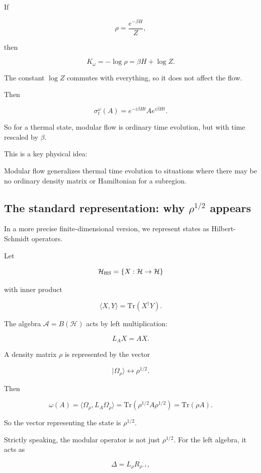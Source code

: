 \documentclass[11pt,a4paper]{article}
\newenvironment{qiqtquote}{\begin{mdframed}[style=quotestyle]}{\end{mdframed}}
\begin{document}
If

\[
\rho=\frac{e^{-\beta H}}{Z},
\]

then

\[
K_\omega=-\log\rho
=
\beta H+\log Z.
\]

The constant $\log Z$ commutes with everything, so it does not affect the flow.

Then

\[
\sigma_t^\omega(A)
=
e^{-i\beta H t} A e^{i\beta H t}.
\]

So for a thermal state, modular flow is ordinary time evolution, but with time rescaled by $\beta$.

This is a key physical idea:

\begin{qiqtquote}
Modular flow generalizes thermal time evolution to situations where there may be no ordinary density matrix or Hamiltonian for a subregion.
\end{qiqtquote}

\subsection{The standard representation: why $\rho^{1/2}$ appears}

In a more precise finite-dimensional version, we represent states as Hilbert-Schmidt operators.

Let

\[
\mathcal{H}_{\rm HS}
=
\{X:\mathcal{H}\to\mathcal{H}\}
\]

with inner product

\[
\langle X,Y\rangle=\mathrm{Tr}(X^\dagger Y).
\]

The algebra $\mathcal{A}=B(\mathcal{H})$ acts by left multiplication:

\[
L_A X=AX.
\]

A density matrix $\rho$ is represented by the vector

\[
|\Omega_\rho\rangle \leftrightarrow \rho^{1/2}.
\]

Then

\[
\omega(A)=\langle \Omega_\rho,L_A\Omega_\rho\rangle
=
\mathrm{Tr}(\rho^{1/2}A\rho^{1/2})
=
\mathrm{Tr}(\rho A).
\]

So the vector representing the state is $\rho^{1/2}$.

Strictly speaking, the modular operator is not just $\rho^{1/2}$. For the left algebra, it acts as

\[
\Delta = L_\rho R_{\rho^{-1}},
\]
\end{document}
